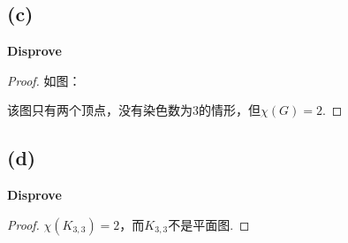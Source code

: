 \documentclass[twocolumn]{article}
\newenvironment{SChinese}{%
	\CJKfamily{gbsn}%
	\CJKtilde
	\CJKnospace}{}
\begin{document}
\begin{CJK}{UTF8}{}
\begin{SChinese}
				\subsection*{(c)}
					\textbf{Disprove}
					\begin{proof}
						如图：
						\begin{center}
						\end{center}
						该图只有两个顶点，没有染色数为3的情形，但$\chi(G)=2$.
					\end{proof}
				\subsection*{(d)}
					\textbf{Disprove}
					\begin{proof}
						$\chi(K_{3,3})=2$，而$K_{3,3}$不是平面图.
					\end{proof}

\end{SChinese}
\end{CJK}
\end{document}
